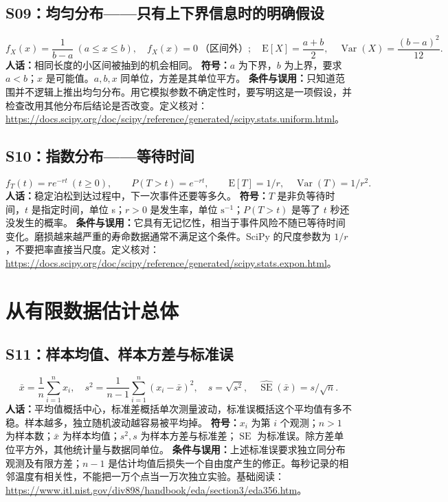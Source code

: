 \subsection{S09：均匀分布——只有上下界信息时的明确假设}
\begin{equation}
 f_X(x)=\frac{1}{b-a}\ (a\le x\le b),\quad f_X(x)=0\ \text{（区间外）};
 \quad\mathrm{E}[X]=\frac{a+b}{2},\quad\operatorname{Var}(X)=\frac{(b-a)^2}{12}.
\end{equation}
\textbf{人话：}相同长度的小区间被抽到的机会相同。
\textbf{符号：}$a$ 为下界，$b$ 为上界，要求 $a<b$；$x$ 是可能值。$a,b,x$ 同单位，方差是其单位平方。
\textbf{条件与误用：}只知道范围并不逻辑上推出均匀分布。用它模拟参数不确定性时，要写明这是一项假设，并检查改用其他分布后结论是否改变。定义核对：\url{https://docs.scipy.org/doc/scipy/reference/generated/scipy.stats.uniform.html}。

\subsection{S10：指数分布——等待时间}
\begin{equation}
 f_T(t)=r e^{-rt}\ (t\ge0),\qquad P(T>t)=e^{-rt},\qquad
 \mathrm{E}[T]=1/r,\quad\operatorname{Var}(T)=1/r^2.
\end{equation}
\textbf{人话：}稳定泊松到达过程中，下一次事件还要等多久。
\textbf{符号：}$T$ 是非负等待时间，$t$ 是指定时间，单位 s；$r>0$ 是发生率，单位 $\mathrm{s}^{-1}$；$P(T>t)$ 是等了 $t$ 秒还没发生的概率。
\textbf{条件与误用：}它具有无记忆性，相当于事件风险不随已等待时间变化。磨损越来越严重的寿命数据通常不满足这个条件。SciPy 的尺度参数为 $1/r$，不要把率直接当尺度。定义核对：\url{https://docs.scipy.org/doc/scipy/reference/generated/scipy.stats.expon.html}。

\section{从有限数据估计总体}
\subsection{S11：样本均值、样本方差与标准误}
\begin{equation}
 \bar{x}=\frac1n\sum_{i=1}^{n}x_i,\quad
 s^2=\frac1{n-1}\sum_{i=1}^{n}(x_i-\bar{x})^2,\quad
 s=\sqrt{s^2},\quad\widehat{\operatorname{SE}}(\bar{x})=s/\sqrt n.
\end{equation}
\textbf{人话：}平均值概括中心，标准差概括单次测量波动，标准误概括这个平均值有多不稳。样本越多，独立随机波动越容易被平均掉。
\textbf{符号：}$x_i$ 为第 $i$ 个观测；$n>1$ 为样本数；$\bar{x}$ 为样本均值；$s^2,s$ 为样本方差与标准差；$\operatorname{SE}$ 为标准误。除方差单位平方外，其他统计量与数据同单位。
\textbf{条件与误用：}上述标准误要求独立同分布观测及有限方差；$n-1$ 是估计均值后损失一个自由度产生的修正。每秒记录的相邻温度有相关性，不能把一万个点当一万次独立实验。基础阅读：\url{https://www.itl.nist.gov/div898/handbook/eda/section3/eda356.htm}。

